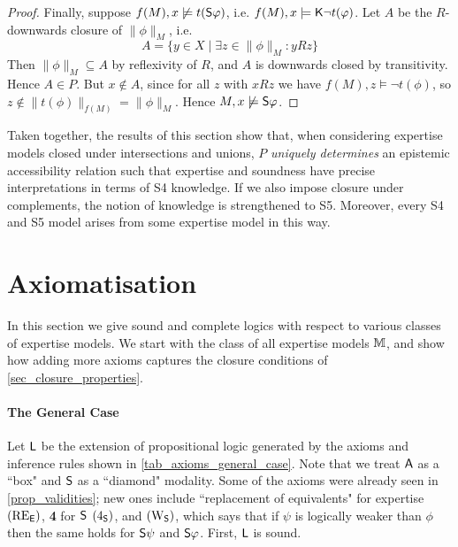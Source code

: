 \begin{proof}
              Finally, suppose $f(M), x \not\models t(\S\phi)$, i.e.  $f(M), x
              \models \K\neg t(\phi)$. Let $A$ be the $R$-downwards closure of
              $\|\phi\|_M$, i.e.
              \[
                  A = \{y \in X \mid \exists z \in \|\phi\|_M: yRz\}
              \]
              Then $\|\phi\|_M \subseteq A$ by reflexivity of $R$, and $A$ is
              downwards closed by transitivity.  Hence $A \in P$.  But $x
              \notin A$, since for all $z$ with $xRz$ we have $f(M), z \models
              \neg t(\phi)$, so $z \notin \|t(\phi)\|_{f(M)} = \|\phi\|_M$.
              Hence $M, x \not\models \S\phi$.
\end{proof}

Taken together, the results of this section show that, when considering
expertise models closed under intersections and unions, $P$ \emph{uniquely determines}
an epistemic accessibility relation such that expertise and soundness have
precise interpretations in terms of S4 knowledge. If we also impose closure
under complements, the notion of knowledge is strengthened to S5. Moreover,
every S4 and S5 model arises from some expertise model in this way.

\section{Axiomatisation}
\label{sec_axiomatisation}

In this section we give sound and complete logics with respect to various
classes of expertise models. We start with the class of all expertise
models $\M$, and show how adding more axioms captures the closure conditions of
\cref{sec_closure_properties}.

\paragraph{The General Case}

Let $\sL$ be the extension of propositional logic generated by the axioms and
inference rules shown in \cref{tab_axioms_general_case}. Note that we treat
$\A$ as a ``box" and $\S$ as a ``diamond" modality. Some of the axioms were
already seen in \cref{prop_validities}; new ones include ``replacement of
equivalents" for expertise $\reE$, \textbf{4} for $\S$ $\foursoundness$,
and $\weakeningS$, which says that if $\psi$ is logically weaker than $\phi$
then the same holds for $\S\psi$ and $\S\phi$. First, $\sL$ is sound.

